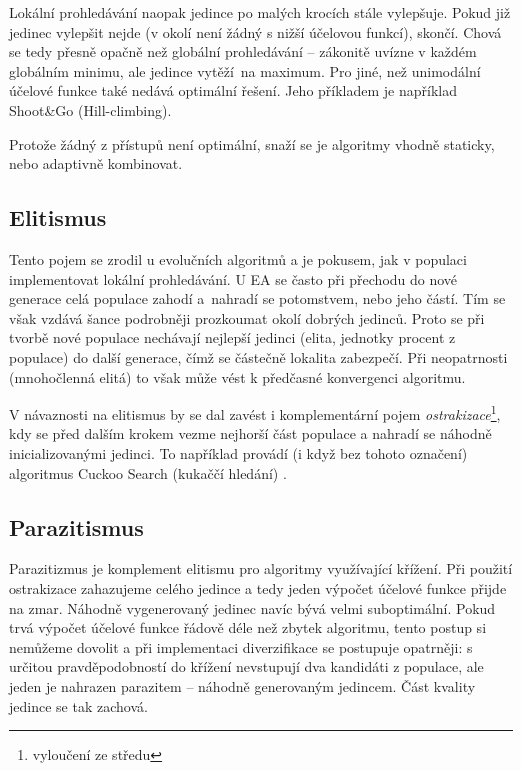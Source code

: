 Lokální prohledávání naopak jedince po malých krocích stále vylepšuje. Pokud již jedinec vylepšit nejde (v okolí není žádný s nižší účelovou funkcí), skončí. Chová se tedy přesně opačně než globální prohledávání -- zákonitě uvízne v každém globálním minimu, ale jedince \bq vytěží\eq ~na maximum. Pro jiné, než unimodální účelové funkce také nedává optimální řešení. Jeho příkladem je například Shoot\&Go (Hill-climbing).

Protože žádný z přístupů není optimální, snaží se je algoritmy vhodně staticky, nebo adaptivně kombinovat.

\subsection{Elitismus}

Tento pojem se zrodil u evolučních algoritmů a je pokusem, jak v populaci implementovat lokální prohledávání. U EA se často při přechodu do nové generace celá populace zahodí a~nahradí se potomstvem, nebo jeho částí. Tím se však vzdává šance podrobněji prozkoumat okolí dobrých jedinců. Proto se při tvorbě nové populace nechávají nejlepší jedinci (elita, jednotky procent z populace) do další generace, čímž se částečně lokalita zabezpečí. Při neopatrnosti (mnohočlenná elitá) to však může vést k předčasné konvergenci algoritmu.

V návaznosti na elitismus by se dal zavést i komplementární pojem \emph{ostrakizace}\footnote{vyloučení ze středu}, kdy se před dalším krokem vezme nejhorší část populace a nahradí se náhodně inicializovanými jedinci. To například provádí (i když bez tohoto označení) algoritmus Cuckoo Search (kukaččí hledání) \cite{cuckoo}.

\subsection{Parazitismus}

Parazitizmus je komplement elitismu pro algoritmy využívající křížení. Při použití ostrakizace zahazujeme celého jedince a tedy jeden výpočet účelové funkce přijde na zmar. Náhodně vygenerovaný jedinec navíc bývá velmi suboptimální. Pokud trvá výpočet účelové funkce řádově déle než zbytek algoritmu, tento postup si nemůžeme dovolit a při implementaci diverzifikace se postupuje opatrněji: s určitou pravděpodobností do křížení nevstupují dva kandidáti z populace, ale jeden je nahrazen parazitem -- náhodně generovaným jedincem. Část kvality jedince se tak zachová.

